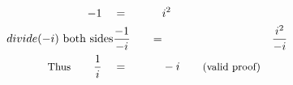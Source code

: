 \begin{alignat*}{5}
&\,&-1\quad&=\quad&&i^2\\
&\small &divide(-i)\text{ both sides}&\frac{-1}{-i}\quad&=&&\frac{i^2}{-i}\\
&\,&\small\text{Thus}\normalsize\qquad\frac{1}{i}\quad&=&&-i\qquad\small\text{(valid proof)}
\end{alignat*}

